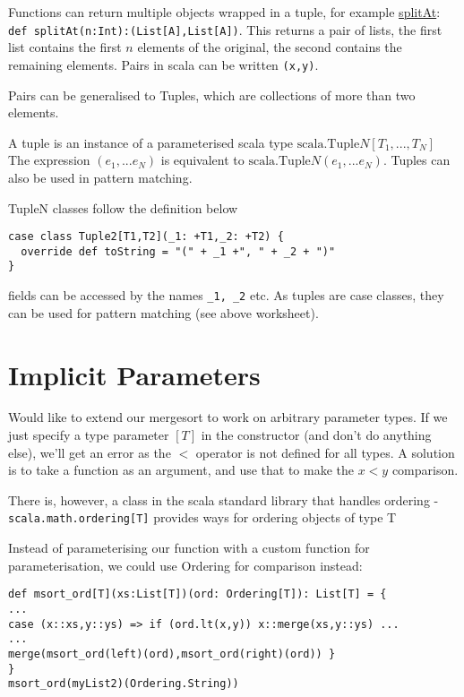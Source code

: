 Functions can return multiple objects wrapped in a tuple, for example \href{https://www.scala-lang.org/api/2.12.3/scala/collection/immutable/List.html#splitAt(n:Int):(List[A],List[A])}{splitAt}:  \lstinline| def splitAt(n:Int):(List[A],List[A])|. This returns a pair of lists, the first list contains the first $n$ elements of the original, the second contains the remaining elements. Pairs in scala can be written \lstinline|(x,y)|.

Pairs can be generalised to Tuples, which are collections of more than two elements.

A tuple is an instance of a parameterised scala type $\mathrm{scala.Tuple}N[T_1,...,T_N]$
The expression $(e_1,...e_N)$ is equivalent to $\mathrm{scala.Tuple}N(e_1,...e_N)$. Tuples can also be used in pattern matching.

TupleN classes follow the definition below
\begin{lstlisting}
case class Tuple2[T1,T2](_1: +T1,_2: +T2) {
  override def toString = "(" + _1 +", " + _2 + ")"
}
\end{lstlisting}
fields can be accessed by the names \lstinline|_1, _2| etc. As tuples are case classes, they can be used for pattern matching (see above worksheet).

\section{Implicit Parameters}

Would like to extend our mergesort to work on arbitrary parameter types. If we just specify a type parameter $[T]$ in the constructor (and don't do anything else), we'll get an error as the $<$ operator is not defined for all types. A solution is to take a function as an argument, and use that to make the $ x < y$ comparison.

There is, however, a class in the scala standard library that handles ordering - \lstinline|scala.math.ordering[T]| provides ways for ordering objects of type T

Instead of parameterising our function with a custom function for parameterisation, we could use Ordering for comparison instead:
\begin{lstlisting}
def msort_ord[T](xs:List[T])(ord: Ordering[T]): List[T] = {
...
case (x::xs,y::ys) => if (ord.lt(x,y)) x::merge(xs,y::ys) ...
...
merge(msort_ord(left)(ord),msort_ord(right)(ord)) }
}
msort_ord(myList2)(Ordering.String))
\end{lstlisting}


